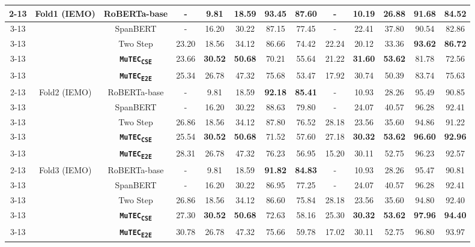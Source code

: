 \documentclass{article}
\newcommand{\subone}{\textbf{\texttt{MuTEC\textsubscript{CSE}}}}
\newcommand{\overall}{\textbf{\texttt{MuTEC\textsubscript{E2E}}}}
\begin{document}
\begin{table*}[t]
{\begin{tabular}{|c|c|c|c|c|c|c|c|c|c|c|c|c|}
\\ 
\cline{2-13} 
& \multirow{5}{*}{Fold1 (IEMO)} 
& RoBERTa-base  & 
 - & 9.81 & 18.59 & \textbf{93.45} & \textbf{87.60} & - & 10.19 & 26.88 & 91.68 & 84.52 \\ \cline{3-13} 
&  & SpanBERT   & 
- & 16.20 & 30.22 & 87.15 & 77.45 & - & 22.41 & 37.80 & 90.54 & 82.86 \\ \cline{3-13} 
&   & Two Step  & 
23.20 & 18.56 & 34.12 &  86.66 & 74.42  &  22.24   &  20.12 & 33.36 & \textbf{93.62}  &  \textbf{86.72}  \\ 
\cline{3-13} 
&   & \subone  & 
23.66 & \textbf{30.52} & \textbf{50.68} &  70.21 & 55.64  &  21.22 & \textbf{31.60} & \textbf{53.62} & 81.78  &  72.56  \\ 
\cline{3-13} 
& & \overall &      
25.34 & 26.78 & 47.32 & 75.68 & 53.47 & 17.92 & 30.74 & 50.39 & 83.74 & 75.63 \\
\cline{2-13} 
& \multirow{5}{*}{Fold2 (IEMO)} 
& RoBERTa-base  & 
- & 9.81  & 18.59 & \textbf{92.18} & \textbf{85.41} & - & 10.93 & 28.26 & 95.49 & 90.85 \\ \cline{3-13} 
&  & SpanBERT  & 
- & 16.20 & 30.22 & 88.63 & 79.80 & - & 24.07 & 40.57 & 96.28 & 92.41 \\ \cline{3-13} 
&  & Two Step &
26.86 & 18.56 & 34.12 & 87.80  & 76.52 & 28.18  & 23.56 & 35.60 & 94.86  & 91.22  \\ 
\cline{3-13} 
&  & \subone &
25.54 & \textbf{30.52} & \textbf{50.68} & 71.52  &  57.60 & 27.18  & \textbf{30.32} & \textbf{53.62} & \textbf{96.60}  & \textbf{92.96}  
\\ 
\cline{3-13} 
& & \overall &      
28.31 & 26.78 & 47.32 & 76.23 & 56.95 & 15.20 & 30.11 & 52.75 & 96.23 & 92.57 
\\ 
\cline{2-13} 
& \multirow{5}{*}{Fold3 (IEMO)} 
& RoBERTa-base  & 
- & 9.81  & 18.59 & \textbf{91.82} & \textbf{84.83} & - & 10.93 & 28.26 & 95.47 & 90.81 \\ \cline{3-13} 
&  & SpanBERT & 
- & 16.20 & 30.22 & 86.95 & 77.25 & - & 24.07 & 40.57 & 96.28 & 92.41 \\ \cline{3-13} 
&  & Two Step  &
26.86 & 18.56 & 34.12  & 86.60 &  75.84 & 28.18 & 23.56  & 35.60  &  94.80 & 92.40      \\
\cline{3-13} 
&  & \subone  &
27.30 & \textbf{30.52} & \textbf{50.68}  & 72.63 &  58.16 & 25.30 & \textbf{30.32} & \textbf{53.62}  & \textbf{97.96}  & \textbf{94.40}   
\\ 
\cline{3-13} 
& & \overall &      
30.78 & 26.78 & 47.32 & 75.66 & 59.78 & 17.02 & 30.11 & 52.75 & 96.80 & 93.97 
\\ \hline
\end{tabular}
}
\caption{Results for Cause Span Extraction task for Two Step, \subone and \overall on RECCON-DD and RECCON-IEMO. IEMO dataset is only used in the inference phase.}
\label{tab:task1_twostep}
\vspace{-3mm}
\end{table*}
\end{document}
